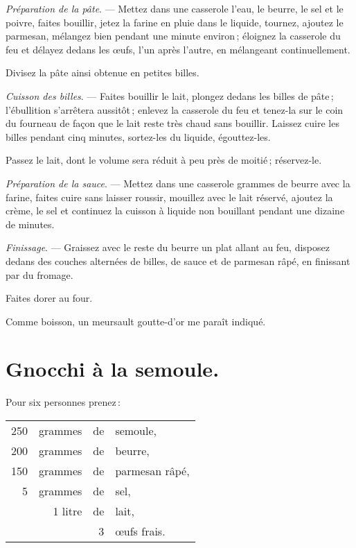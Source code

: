 \textit{Préparation de la pâte}. — Mettez dans une casserole l'eau, le beurre,
le sel et le poivre, faites bouillir, jetez la farine en pluie dans le liquide,
tournez, ajoutez le parmesan, mélangez bien pendant une minute environ ;
éloignez la casserole du feu et délayez dedans les œufs, l'un après l'autre, en
mélangeant continuellement.

Divisez la pâte ainsi obtenue en petites billes.

\medskip

\textit{Cuisson des billes}. — Faites bouillir le lait, plongez dedans les
billes de pâte ; l'ébullition s'arrêtera aussitôt ; enlevez la casserole du feu
et tenez-la sur le coin du fourneau de façon que le lait reste très chaud sans
bouillir. Laissez cuire les billes pendant cinq minutes, sortez-les du liquide,
égouttez-les.

Passez le lait, dont le volume sera réduit à peu près de moitié ; réservez-le.

\medskip

\textit{Préparation de la sauce}. — Mettez dans une casserole {\mmm}
grammes de beurre avec la farine, faites cuire sans laisser roussir, mouillez
avec le lait réservé, ajoutez la crème, le sel et continuez la cuisson
à liquide non bouillant pendant une dizaine de minutes.

\medskip

\textit{Finissage}. — Graissez avec le reste du beurre un plat allant au feu, disposez
dedans des couches alternées de billes, de sauce et de parmesan râpé, en finissant
par du fromage.

Faites dorer au four.

Comme boisson, un meursault goutte-d'or me paraît indiqué.

\section*{\centering Gnocchi à la semoule.}
{}

Pour six personnes prenez :

\footnotesize
\begin{longtable}{rrrp{16em}}
    250 & grammes & de & semoule,                                                                         \\
    200 & grammes & de & beurre,                                                                          \\
    150 & grammes & de & parmesan râpé,                                                                   \\
      5 & grammes & de & sel,                                                                             \\
        & 1 litre & de & lait,                                                                            \\
        &         &  3 & œufs frais.                                                                      \\
\end{longtable}
\normalsize

